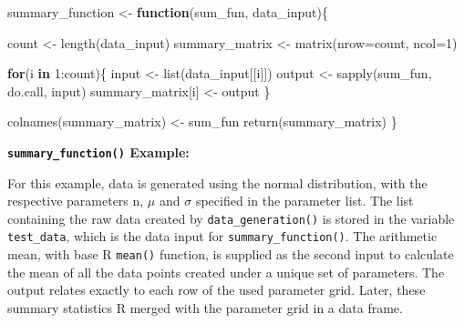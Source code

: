 \documentclass[11pt,a4paper]{article}
\newenvironment{Shaded}{\begin{snugshade}}{\end{snugshade}}
\newcommand{\AttributeTok}[1]{\textcolor[rgb]{0.77,0.63,0.00}{#1}}
\newcommand{\ControlFlowTok}[1]{\textcolor[rgb]{0.13,0.29,0.53}{\textbf{#1}}}
\newcommand{\DecValTok}[1]{\textcolor[rgb]{0.00,0.00,0.81}{#1}}
\newcommand{\FunctionTok}[1]{\textcolor[rgb]{0.00,0.00,0.00}{#1}}
\newcommand{\NormalTok}[1]{#1}
\newcommand{\OtherTok}[1]{\textcolor[rgb]{0.56,0.35,0.01}{#1}}
\newcommand{\SpecialCharTok}[1]{\textcolor[rgb]{0.00,0.00,0.00}{#1}}
\begin{document}
\begin{Shaded}
\begin{Highlighting}[]
\NormalTok{summary\_function }\OtherTok{\textless{}{-}} \ControlFlowTok{function}\NormalTok{(sum\_fun, data\_input)\{}
  
\NormalTok{  count }\OtherTok{\textless{}{-}} \FunctionTok{length}\NormalTok{(data\_input)}
\NormalTok{  summary\_matrix }\OtherTok{\textless{}{-}} \FunctionTok{matrix}\NormalTok{(}\AttributeTok{nrow=}\NormalTok{count, }\AttributeTok{ncol=}\DecValTok{1}\NormalTok{)}
  
  \ControlFlowTok{for}\NormalTok{(i }\ControlFlowTok{in} \DecValTok{1}\SpecialCharTok{:}\NormalTok{count)\{}
\NormalTok{    input }\OtherTok{\textless{}{-}} \FunctionTok{list}\NormalTok{(data\_input[[i]])}
\NormalTok{    output }\OtherTok{\textless{}{-}} \FunctionTok{sapply}\NormalTok{(sum\_fun, do.call, input)}
\NormalTok{    summary\_matrix[i] }\OtherTok{\textless{}{-}}\NormalTok{ output}
\NormalTok{  \}}

  \FunctionTok{colnames}\NormalTok{(summary\_matrix) }\OtherTok{\textless{}{-}}\NormalTok{ sum\_fun}
  \FunctionTok{return}\NormalTok{(summary\_matrix)}
\NormalTok{\}}
\end{Highlighting}
\end{Shaded}

\textbf{\texttt{summary\_function()} Example:}

For this example, data is generated using the normal distribution, with
the respective parameters n, \(\mu\) and \(\sigma\) specified in the
parameter list. The list containing the raw data created by
\texttt{data\_generation()} is stored in the variable
\texttt{test\_data}, which is the data input for
\texttt{summary\_function()}. The arithmetic mean, with base R
\texttt{mean()} function, is supplied as the second input to calculate
the mean of all the data points created under a unique set of
parameters. The output relates exactly to each row of the used parameter
grid. Later, these summary statistics R merged with the parameter grid
in a data frame.
\end{document}
